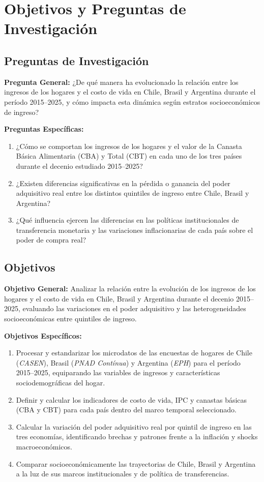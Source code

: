 \section{Objetivos y Preguntas de Investigación}

\subsection{Preguntas de Investigación}
\textbf{Pregunta General:}
¿De qué manera ha evolucionado la relación entre los ingresos de los hogares y el costo de vida en Chile, Brasil y Argentina durante el período 2015--2025, y cómo impacta esta dinámica según estratos socioeconómicos de ingreso?

\textbf{Preguntas Específicas:}
\begin{enumerate}
    \item ¿Cómo se comportan los ingresos de los hogares y el valor de la Canasta Básica Alimentaria (CBA) y Total (CBT) en cada uno de los tres países durante el decenio estudiado 2015--2025?
    \item ¿Existen diferencias significativas en la pérdida o ganancia del poder adquisitivo real entre los distintos quintiles de ingreso entre Chile, Brasil y Argentina?
    \item ¿Qué influencia ejercen las diferencias en las políticas institucionales de transferencia monetaria y las variaciones inflacionarias de cada país sobre el poder de compra real?
\end{enumerate}

\subsection{Objetivos}
\textbf{Objetivo General:}
Analizar la relación entre la evolución de los ingresos de los hogares y el costo de vida en Chile, Brasil y Argentina durante el decenio 2015--2025, evaluando las variaciones en el poder adquisitivo y las heterogeneidades socioeconómicas entre quintiles de ingreso.

\textbf{Objetivos Específicos:}
\begin{enumerate}
    \item Procesar y estandarizar los microdatos de las encuestas de hogares de Chile (\textit{CASEN}), Brasil (\textit{PNAD Contínua}) y Argentina (\textit{EPH}) para el período 2015--2025, equiparando las variables de ingresos y características sociodemográficas del hogar.
    \item Definir y calcular los indicadores de costo de vida, IPC y canastas básicas (CBA y CBT) para cada país dentro del marco temporal seleccionado.
    \item Calcular la variación del poder adquisitivo real por quintil de ingreso en las tres economías, identificando brechas y patrones frente a la inflación y shocks macroeconómicos.
    \item Comparar socioeconómicamente las trayectorias de Chile, Brasil y Argentina a la luz de sus marcos institucionales y de política de transferencias.
\end{enumerate}